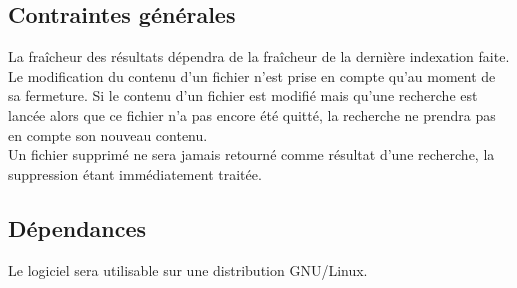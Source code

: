 \documentclass[a4paper,10pt]{article}
\begin{document}
\subsection{Contraintes générales}
La fraîcheur des résultats dépendra de la fraîcheur de la dernière indexation faite.\\
Le modification du contenu d'un fichier n'est prise en compte qu'au moment de sa
fermeture. Si le contenu d'un fichier est modifié mais qu'une recherche est
lancée alors que ce fichier n'a pas encore été quitté, la recherche ne prendra
pas en compte son nouveau contenu.\\
Un fichier supprimé ne sera jamais retourné comme résultat d'une recherche, la
suppression étant immédiatement traitée.


\subsection{Dépendances}
Le logiciel sera utilisable sur une distribution GNU/Linux.

\newpage
\end{document}
